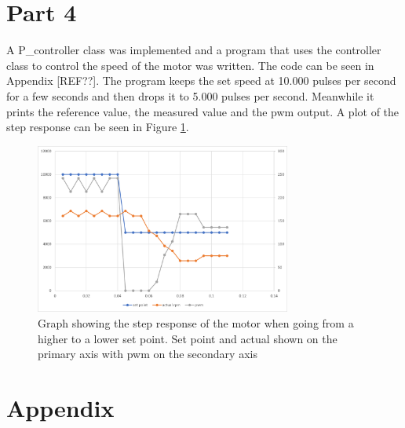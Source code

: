 \documentclass{article}
\begin{document}
\section{Part 4}
A P\_controller class was implemented and a program that uses the controller class to control the speed of the motor was written. The code can be seen in Appendix [REF??]. 
The program keeps the set speed at 10.000 pulses per second for a few seconds and then drops it to 5.000 pulses per second. Meanwhile it prints the reference value, the measured value and the pwm output. A plot of the step response can be seen in Figure \ref{fig:step_response}.

\begin{figure}[h]
    \centering
    \includegraphics[width=0.75\textwidth]{Project2SpeedController/step_response2.png}
    \caption{Graph showing the step response of the motor when going from a higher to a lower set point. Set point and actual shown on the primary axis with pwm on the secondary axis}
    \label{fig:step_response}
\end{figure}

\section*{Appendix}
\appendix
\end{document}
